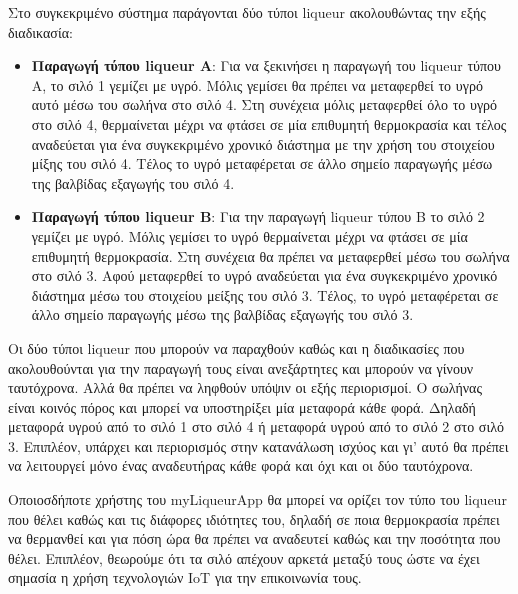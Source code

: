 	Στο συγκεκριμένο σύστημα παράγονται δύο τύποι liqueur ακολουθώντας την εξής διαδικασία: 

\begin{itemize}
	\item{\textbf{Παραγωγή τύπου liqueur A}: Για να ξεκινήσει η παραγωγή του liqueur τύπου Α, το σιλό 1 γεμίζει με υγρό. Μόλις γεμίσει θα πρέπει να μεταφερθεί το υγρό αυτό μέσω του σωλήνα στο σιλό 4. Στη συνέχεια μόλις μεταφερθεί όλο το υγρό στο σιλό 4, θερμαίνεται μέχρι να φτάσει σε μία επιθυμητή θερμοκρασία και τέλος αναδεύεται για ένα συγκεκριμένο χρονικό διάστημα με την χρήση του στοιχείου μίξης του σιλό 4. Τέλος το υγρό μεταφέρεται σε άλλο σημείο παραγωγής μέσω της βαλβίδας εξαγωγής του σιλό 4. }
	\item{\textbf{Παραγωγή τύπου liqueur B}: Για την παραγωγή liqueur τύπου Β το σιλό 2 γεμίζει με υγρό. Μόλις γεμίσει το υγρό θερμαίνεται μέχρι να φτάσει σε μία επιθυμητή θερμοκρασία. Στη συνέχεια θα πρέπει να μεταφερθεί μέσω του σωλήνα στο σιλό 3. Αφού μεταφερθεί το υγρό αναδεύεται για ένα συγκεκριμένο χρονικό διάστημα μέσω του στοιχείου μείξης του σιλό 3. Τέλος, το υγρό μεταφέρεται σε άλλο σημείο παραγωγής μέσω της βαλβίδας εξαγωγής του σιλό 3. }
\end{itemize}

Οι δύο τύποι liqueur που μπορούν να παραχθούν καθώς και η διαδικασίες που ακολουθούνται για την παραγωγή τους είναι ανεξάρτητες και μπορούν να γίνουν ταυτόχρονα. Αλλά θα πρέπει να ληφθούν υπόψιν οι εξής περιορισμοί. Ο σωλήνας είναι κοινός πόρος και μπορεί να υποστηρίξει μία μεταφορά κάθε φορά. Δηλαδή μεταφορά υγρού από το σιλό 1 στο σιλό 4 ή μεταφορά υγρού από το σιλό 2 στο σιλό 3. Επιπλέον, υπάρχει και περιορισμός στην κατανάλωση ισχύος και γι’ αυτό θα πρέπει να λειτουργεί μόνο ένας αναδευτήρας κάθε φορά και όχι και οι δύο ταυτόχρονα. 

Οποιοσδήποτε χρήστης του myLiqueurApp θα μπορεί να ορίζει τον τύπο του liqueur που θέλει καθώς και τις διάφορες ιδιότητες του, δηλαδή σε ποια θερμοκρασία πρέπει να θερμανθεί και για πόση ώρα θα πρέπει να αναδευτεί καθώς και την ποσότητα που θέλει. Επιπλέον, θεωρούμε ότι τα σιλό απέχουν αρκετά μεταξύ τους ώστε να έχει σημασία η χρήση τεχνολογιών IoT για την επικοινωνία τους.